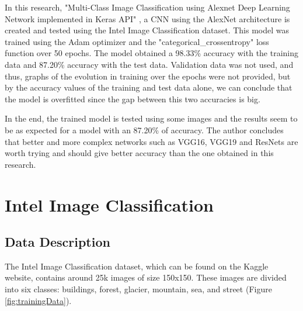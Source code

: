 \documentclass[conference]{IEEEtran}
\begin{document}
In this research, "Multi-Class Image Classification using Alexnet Deep Learning Network implemented in Keras API" \cite{web:IntelAlexNet:2020}, a CNN using the AlexNet architecture is created and tested using the Intel Image Classification dataset. This model was trained using the Adam optimizer and the "categorical\_crossentropy" loss function over 50 epochs. The model obtained a 98.33\% accuracy with the training data and 87.20\% accuracy with the test data. Validation data was not used, and thus, graphs of the evolution in training over the epochs were not provided, but by the accuracy values of the training and test data alone, we can conclude that the model is overfitted since the gap between this two accuracies is big.

In the end, the trained model is tested using some images and the results seem to be as expected for a model with an 87.20\% of accuracy. The author concludes that better and more complex networks such as VGG16, VGG19 and ResNets are worth trying and should give better accuracy than the one obtained in this research.

\section{Intel Image Classification}

\subsection{Data Description}

The Intel Image Classification dataset, which can be found on the Kaggle website, contains around 25k images of size 150x150. These images are divided into six classes: buildings, forest, glacier, mountain, sea, and street \cite{web:dataset:2019} (Figure \ref{fig:trainingData}).
\end{document}
